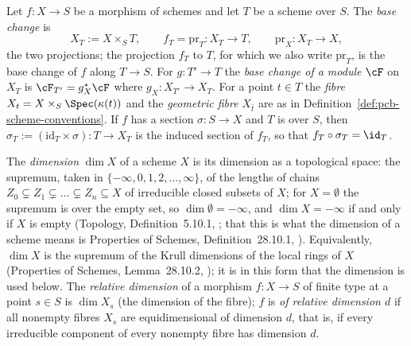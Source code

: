 \begin{definition}
\label{def:pc-base-change}
Let $f:X\to S$ be a morphism of schemes and let $T$ be a scheme over
$S$.  The \emph{base change} is
\[
X_T:=X\times_ST,\qquad
f_T=\mathrm{pr}_T:X_T\longrightarrow T,\qquad
\mathrm{pr}_X:X_T\longrightarrow X,
\]
the two projections; the projection $f_T$ to $T$, for which we also write
$\mathrm{pr}_T$, is the base change of $f$ along $T\to S$.  For
$g:T'\to T$ the \emph{base change of a
module} $\cF$ on $X_T$ is $\cF_{T'}=g_X^*\cF$ where
$g_X:X_{T'}\to X_T$.  For a point $t\in T$ the \emph{fibre}
$X_t=X\times_S\Spec(\kappa(t))$ and the \emph{geometric fibre} $X_{\bar
t}$ are as in
Definition~\ref{def:pcb-scheme-conventions}.
If $f$ has a section $\sigma:S\to X$ and $T$ is over $S$, then
$\sigma_T:=(\mathrm{id}_T\times\sigma):T\to X_T$ is the induced section
of $f_T$, so that $f_T\circ\sigma_T=\id_T$.
\end{definition}

\begin{definition}[Dimension]\label{def:pc-dimension}
The \emph{dimension} $\dim X$ of a scheme $X$ is its dimension as a
topological space: the supremum, taken in
$\{-\infty,0,1,2,\dots,\infty\}$, of the lengths of chains
$Z_0\subsetneq Z_1\subsetneq\dots\subsetneq Z_n\subseteq X$ of
irreducible closed subsets of $X$; for $X=\emptyset$ the supremum is
over the empty set, so $\dim\emptyset=-\infty$, and $\dim X=-\infty$ if
and only if $X$ is empty (Topology, Definition~5.10.1,
; that this is what the dimension of a scheme
means is Properties of Schemes, Definition~28.10.1,
).  Equivalently, $\dim X$ is the supremum of the
Krull dimensions of the local rings of $X$ (Properties of Schemes,
Lemma~28.10.2, ); it is in this form that the
dimension is used below.  The
\emph{relative dimension} of a morphism $f:X\to S$ of finite type at a
point $s\in S$ is $\dim X_s$ (the dimension of the fibre); $f$ is
\emph{of relative dimension $d$} if all nonempty fibres $X_s$ are
equidimensional of dimension $d$, that is, if every irreducible
component of every nonempty fibre has dimension $d$.
\end{definition}

